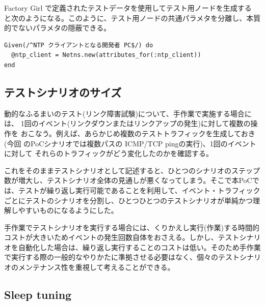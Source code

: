 Factory Girl で定義されたテストデータを使用してテスト用ノードを生成する
と次のようになる。このように、テスト用ノードの共通パラメタを分離し、本質
的でないパラメタの隠蔽できる。
\begin{lstlisting}
Given(/^NTP クライアントとなる開発者 PC$/) do
  @ntp_client = Netns.new(attributes_for(:ntp_client))
end
\end{lstlisting}

  \subsection{テストシナリオのサイズ}


動的なふるまいのテスト(リンク障害試験)について、手作業で実施する場合には、
1回のイベント(リンクダウンまたはリンクアップの発生)に対して複数の操作を
おこなう。例えば、あらかじめ複数のテストトラフィックを生成しておき(今回
のPoCシナリオでは複数パスの ICMP/TCP pingの実行)、1回のイベントに対して
それらのトラフィックがどう変化したのかを確認する。

これをそのままテストシナリオとして記述すると、ひとつのシナリオのステップ
数が増大し、テストシナリオ全体の見通しが悪くなってしまう。そこで本PoCで
は、テストが繰り返し実行可能であることを利用して、イベント・トラフィック
ごとにテストのシナリオを分割し、ひとつひとつのテストシナリオが単純かつ理
解しやすいものになるようにした。

手作業でテストシナリオを実行する場合には、くりかえし実行(作業)する時間的
コストが大きいためイベントの発生回数自体をおさえる。しかし、テストシナリ
オを自動化した場合は、繰り返し実行することのコストは低い。そのため手作業
で実行する際の一般的なやりかたに準拠させる必要はなく、個々のテストシナリ
オのメンテナンス性を重視して考えることができる。

  \subsection{Sleep tuning}
  \label{sec:sleep-tuning}

